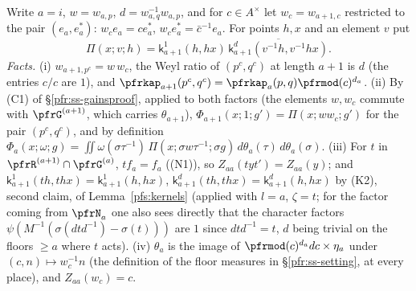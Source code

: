 \documentclass[10pt]{amsart}
\theoremstyle{definition}
\theoremstyle{remark}
\begin{document}
Write $a=i$, $w=w_{a,p}$, $d=w_{a,q}^{-1}w_{a,p}$, and for $c\in A^\times$ let $w_c=w_{a+1,c}$ restricted to the pair
$(e_a,e_a^*)$: $w_ce_a=ce_a^*$, $w_ce_a^*=\bar c^{-1}e_a$. For points $h,x$ and an element $v$ put
\[
\Pi(x;v;h)=\mathsf k^1_{a+1}(h,hx)\,\overline{\mathsf k^{d}_{a+1}(v^{-1}h,v^{-1}hx)} .
\]
\emph{Facts.} (i) $w_{a+1,p^c}=w\,w_c$, the Weyl ratio of $(p^c,q^c)$ at length $a+1$ is $d$ (the entries $c/c$
are $1$), and $\pfrkap_{a+1}(p^c,q^c)=\pfrkap_a(p,q)\pfrmod(c)^{d_a}$. (ii) By (C1) of \S\ref{pfr:ss-gainsproof},
applied to both factors (the elements $w,w_c$ commute with $\pfrG^{(a+1)}$, which carries $\theta_{a+1}$),
$\Phi_{a+1}(x;1;g')=\Pi(x;ww_c;g')$ for the pair $(p^c,q^c)$, and by definition
$\Phi_a(x;\omega;g)=\iint\omega(\sigma\tau^{-1})\,\Pi(x;\sigma w\tau^{-1};\sigma g)\,d\theta_a(\tau)\,d\theta_a(\sigma)$. (iii) For
$t$ in $\pfrR^{(a+1)}\cap\pfrG^{(a)}$, $tf_a=f_a$ ((N1)), so $Z_{aa}(tyt')=Z_{aa}(y)$; and $\mathsf k^{1}_{a+1}(th,thx)=
\mathsf k^{1}_{a+1}(h,hx)$, $\mathsf k^{d}_{a+1}(th,thx)=\mathsf k^{d}_{a+1}(h,hx)$ by (K2), second claim, of Lemma~\ref{pfs:kernels} (applied with
$l=a$, $\zeta=t$; for the factor coming from $\pfrN_a$ one also sees directly that the character factors
$\psi(M^{-1}(\sigma(dtd^{-1})-\sigma(t)))$ are $1$ since $dtd^{-1}=t$, $d$ being trivial on the floors $\ge a$ where $t$
acts). (iv) $\theta_a$ is the image of $\pfrmod(c)^{d_a}dc\times\eta_a$ under $(c,n)\mapsto w_c^{-1}n$
(the definition of the floor measures in \S\ref{pfr:ss-setting}, at every place), and $Z_{aa}(w_c)=c$.
\end{document}
